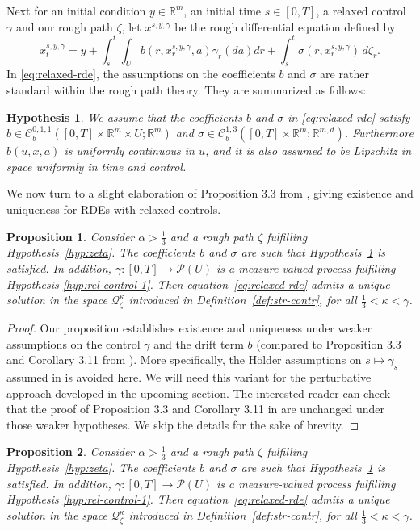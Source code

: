 \documentclass[10pt,a4paper]{amsart}
\newtheorem{proposition}{Proposition}
\newtheorem{hypothesis}{Hypothesis}
\newcommand{\R}{\mathbb R}
\newcommand{\al}{\alpha}
\newcommand{\beq}{\begin{equation}}
\newcommand{\bzeta}{{\zeta}}
\newcommand{\cq}{\mathcal Q}
\newcommand{\eeq}{\end{equation}}
\newcommand{\ga}{\gamma}
\newcommand{\ka}{\kappa}
\newcommand{\si}{\sigma}
\begin{document}
\noindent
Next for an initial condition $y \in \R^m$, an initial time $s \in [0,T]$, a relaxed control $\ga$ and our rough path $\bzeta$, let $x^{s,y,\ga}$ be the rough differential equation defined by
\beq\label{eq:relaxed-rde}
x_t^{s,y,\ga} = y+\int_s^t \int_U b(r, x_r^{s,y,\ga},a)\ga_r(da)dr + \int_s^t \si(r, x_r^{s,y,\ga}) \, d \bzeta_r .
\eeq
In \eqref{eq:relaxed-rde}, the assumptions on the coefficients $b$ and $\si$ are rather standard within the rough path theory. They are summarized as follows:
\begin{hypothesis}\label{hyp:coeff}
	We assume that the coefficients $b$ and $\sigma$ in \eqref{eq:relaxed-rde} satisfy $b \in \mathcal C_b^{0,1,1}([0,T] \times \R^m \times U; \R^m)$ and $\sigma \in \mathcal C_b^{1,3}([0,T]\times \R^m; \R^{m,d})$. \emph{Furthermore $b(u, x, a)$ is uniformly continuous in $u$, and it is also assumed to be Lipschitz in space uniformly in time and control.}\end{hypothesis}
We now turn to a slight elaboration of Proposition 3.3 from \cite{CHT}, giving existence and uniqueness for RDEs with relaxed controls.
\begin{proposition}\label{ExistUniq2}
Consider $\al > \frac{1}{3}$ and a rough path $\bzeta$ fulfilling Hypothesis~\ref{hyp:zeta}. The coefficients $b$ and $\si$ are such that Hypothesis~\ref{hyp:coeff} is satisfied. In addition, $\ga \colon [0,T]\to \mathcal{P}(U)$ is a measure-valued process fulfilling Hypothesis \ref{hyp:rel-control-1}. Then equation~\eqref{eq:relaxed-rde} admits a unique solution in the space $\cq_{\bzeta}^{\ka}$ introduced in Definition~\ref{def:str-contr}, for all $\frac{1}{3} < \ka < \ga$.
\end{proposition}
\begin{proof}
    Our proposition establishes existence and uniqueness under weaker assumptions on the control $\gamma$ and the drift term $b$ (compared to Proposition 3.3 and Corollary 3.11 from \cite{CHT}). More specifically, the H\"older assumptions on $s\mapsto \gamma_{s}$ assumed in \cite{CHT} is avoided here. We will need this variant for the perturbative approach developed in the upcoming section. The interested reader can check that the proof of Proposition 3.3 and Corollary 3.11 in \cite{CHT} are unchanged under those weaker hypotheses. We skip the details for the sake of brevity.\end{proof}

\begin{proposition}
Consider $\al > \frac{1}{3}$ and a rough path $\bzeta$ fulfilling Hypothesis~\ref{hyp:zeta}. The coefficients $b$ and $\si$ are such that Hypothesis~\ref{hyp:coeff} is satisfied. In addition, $\ga \colon [0,T]\to \mathcal{P}(U)$ is a measure-valued process fulfilling Hypothesis \ref{hyp:rel-control-1}. Then equation~\eqref{eq:relaxed-rde} admits a unique solution in the space $\cq_{\bzeta}^{\ka}$ introduced in Definition~\ref{def:str-contr}, for all $\frac{1}{3} < \ka < \ga$.
\end{proposition}
\end{document}
